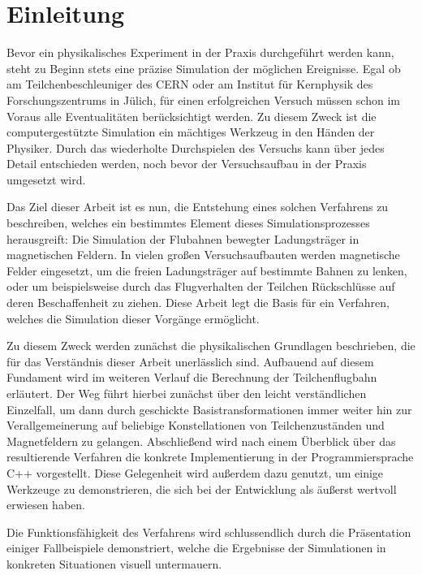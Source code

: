 \chapter{Einleitung}

Bevor ein physikalisches Experiment in der Praxis durchgef\"uhrt werden kann, steht zu Beginn stets eine
pr\"azise Simulation der m\"oglichen Ereignisse. Egal ob am Teilchenbeschleuniger des CERN oder am
Institut f\"ur Kernphysik des Forschungszentrums in J\"ulich, f\"ur einen erfolgreichen Versuch
m\"ussen schon im Voraus alle Eventualit\"aten ber\"ucksichtigt werden. Zu diesem Zweck ist die
computergest\"utzte Simulation ein m\"achtiges Werkzeug in den H\"anden der Physiker. Durch das
wiederholte Durchspielen des Versuchs kann \"uber jedes Detail entschieden werden, noch bevor der
Versuchsaufbau in der Praxis umgesetzt wird.

Das Ziel dieser Arbeit ist es nun, die Entstehung eines
solchen Verfahrens zu beschreiben, welches ein bestimmtes Element dieses Simulationsprozesses
herausgreift: Die Simulation der Flubahnen bewegter Ladungstr\"ager in magnetischen Feldern.
In vielen gro{\ss}en Versuchsaufbauten werden magnetische
Felder eingesetzt, um die freien Ladungstr\"ager auf bestimmte Bahnen zu lenken, oder um
beispielsweise durch das Flugverhalten der Teilchen R\"uckschl\"usse auf deren Beschaffenheit zu
ziehen. Diese Arbeit legt die Basis f\"ur ein Verfahren, welches die Simulation dieser Vorg\"ange
erm\"oglicht.

Zu diesem Zweck werden zun\"achst die physikalischen Grundlagen beschrieben, die f\"ur das
Verst\"andnis dieser Arbeit unerl\"asslich sind. Aufbauend auf diesem Fundament wird im weiteren
Verlauf die Berechnung der Teilchenflugbahn erl\"autert. Der Weg f\"uhrt hierbei zun\"achst \"uber
den leicht verst\"andlichen Einzelfall, um dann durch geschickte Basistransformationen immer weiter
hin zur Verallgemeinerung auf beliebige Konstellationen von Teilchenzust\"anden und Magnetfeldern zu
gelangen. Abschlie{\ss}end wird nach einem \"Uberblick \"uber das resultierende Verfahren die
konkrete Implementierung in der Programmiersprache C++ vorgestellt. Diese Gelegenheit wird
au{\ss}erdem dazu genutzt, um einige Werkzeuge zu demonstrieren, die sich bei der Entwicklung als
\"au{\ss}erst wertvoll erwiesen haben.

Die Funktionsf\"ahigkeit des Verfahrens wird schlussendlich
durch die Pr\"asentation einiger Fallbeispiele demonstriert, welche die Ergebnisse der Simulationen in
konkreten Situationen visuell untermauern.
